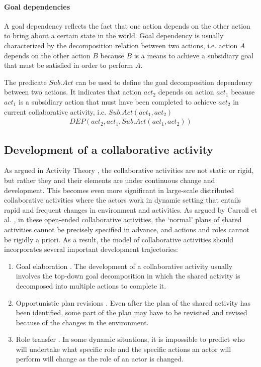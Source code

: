 \paragraph*{Goal dependencies} %
\label{par:goal_dependencies}
A goal dependency reflects the fact that one action depends on the other action to bring about a certain state in the world. Goal dependency is usually characterized by the decomposition relation between two actions, i.e. action $A$ depends on the other action $B$ because $B$ is a means to achieve a subsidiary goal that must be satisfied in order to perform $A$.

The predicate $Sub.Act$ can be used to define the goal decomposition dependency between two actions. It indicates that action $act_2$ depends on action $act_1$ because $act_1$ is a subsidiary action that must have been completed to achieve $act_2$ in current collaborative activity, i.e. $Sub.Act(act_1, act_2)$
\begin{align*} 
	 DEP(act_2, act_1, Sub.Act(act_1, act_2))
\end{align*}

\subsection{Development of a collaborative activity} %
\label{sub:development_of_a_collaborative_activity}
As argued in Activity Theory \cite{nardi1996context}, the collaborative activities are not static or rigid, but rather they and their elements are under continuous change and development. This becomes even more significant in large-scale distributed collaborative activities where the actors work in dynamic setting that entails rapid and frequent changes in environment and activities. As argued by Carroll et al. \cite{carroll2006a}, in these open-ended collaborative activities, the `normal' plans of shared activities cannot be precisely specified in advance, and actions and roles cannot be rigidly a priori. As a result, the model of collaborative activities should incorporates several important development trajectories:

\begin{enumerate}
 	\item Goal elaboration \cite{Grosz2006}. The development of a collaborative activity usually involves the top-down goal decomposition in which the shared activity is decomposed into multiple actions to complete it. 
 	\item Opportunistic plan revisions \cite{suchman1987plans}. Even after the plan of the shared activity has been identified, some part of the plan may have to be revisited and revised because of the changes in the environment.
 	\item Role transfer \cite{Turoff2004}. In some dynamic situations, it is impossible to predict who will undertake what specific role and the specific actions an actor will perform will change as the role of an actor is changed. 
 \end{enumerate} 

